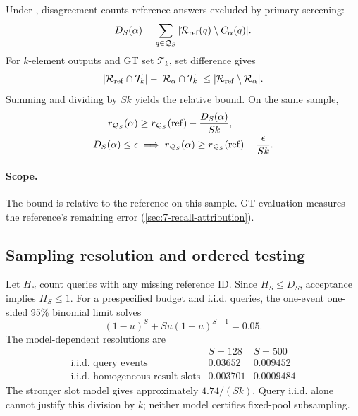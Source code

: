 Under , disagreement counts reference answers
excluded by primary screening:
\begin{equation}
 D_S(\alpha)=\sum_{q\in\mathcal Q_S}
       |\mathcal R_{\rm ref}(q)\setminus C_\alpha(q)|.
 \label{eq:6-reference-coverage}
\end{equation}
For $k$-element outputs and GT set $\mathcal T_k$, set difference gives
\[
 |\mathcal R_{\rm ref}\cap\mathcal T_k|-|\mathcal R_\alpha\cap\mathcal T_k|
 \leq|\mathcal R_{\rm ref}\setminus\mathcal R_\alpha|.
\]
Summing and dividing by $Sk$ yields the relative bound. On the same sample,
\begin{equation}
 \begin{aligned}
 r_{\mathcal Q_S}(\alpha)
 &\geq r_{\mathcal Q_S}({\rm ref})-\frac{D_S(\alpha)}{Sk},\\
 D_S(\alpha)\leq\epsilon
 &\implies r_{\mathcal Q_S}(\alpha)
       \geq r_{\mathcal Q_S}({\rm ref})-\frac{\epsilon}{Sk}.
 \end{aligned}
 \label{eq:6-relative-recall}
\end{equation}
\paragraph{Scope.}
The bound is relative to the reference on this sample. GT evaluation
measures the reference's remaining error (\cref{sec:7-recall-attribution}).

\subsection{Sampling resolution and ordered testing}

Let $H_S$ count queries with any missing reference ID. Since $H_S\leq D_S$,
acceptance implies $H_S\leq1$. For a prespecified budget and i.i.d. queries, the one-event one-sided 95\% binomial limit solves \cite{nist_binomial}
\begin{equation}
 (1-u)^S+Su(1-u)^{S-1}=0.05.
 \label{eq:6-binomial-limit}
\end{equation}
The model-dependent resolutions are
\[
 \begin{array}{c|cc}
 &S=128&S=500\\\hline
 \text{i.i.d. query events}&0.03652&0.009452\\
 \text{i.i.d. homogeneous result slots}&0.003701&0.0009484
 \end{array}
\]
The stronger slot model gives approximately $4.74/(Sk)$. Query i.i.d. alone cannot justify this division by $k$; neither model certifies fixed-pool subsampling.

